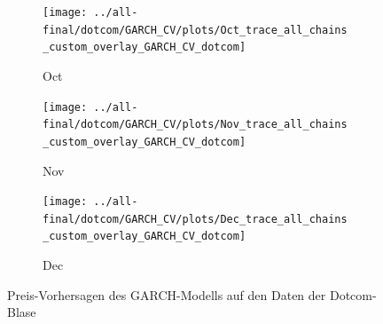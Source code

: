 \documentclass[ngerman]{ttlab-qualify}
\begin{document}
\begin{figure}[H]
  \begin{subfigure}{.3\linewidth}
  \texttt{[image: ../all-final/dotcom/GARCH\_CV/plots/Oct\_trace\_all\_chains\_custom\_overlay\_GARCH\_CV\_dotcom]}\hfill
  \caption{Oct}
  \end{subfigure}
  \begin{subfigure}{.3\linewidth}
  \texttt{[image: ../all-final/dotcom/GARCH\_CV/plots/Nov\_trace\_all\_chains\_custom\_overlay\_GARCH\_CV\_dotcom]}\hfill
  \caption{Nov}
  \end{subfigure}
  \begin{subfigure}{.3\linewidth}
  \texttt{[image: ../all-final/dotcom/GARCH\_CV/plots/Dec\_trace\_all\_chains\_custom\_overlay\_GARCH\_CV\_dotcom]}\hfill
  \caption{Dec}
  \end{subfigure}
  \caption{Preis-Vorhersagen des GARCH-Modells auf den Daten der Dotcom-Blase}
\end{figure}
\end{document}
